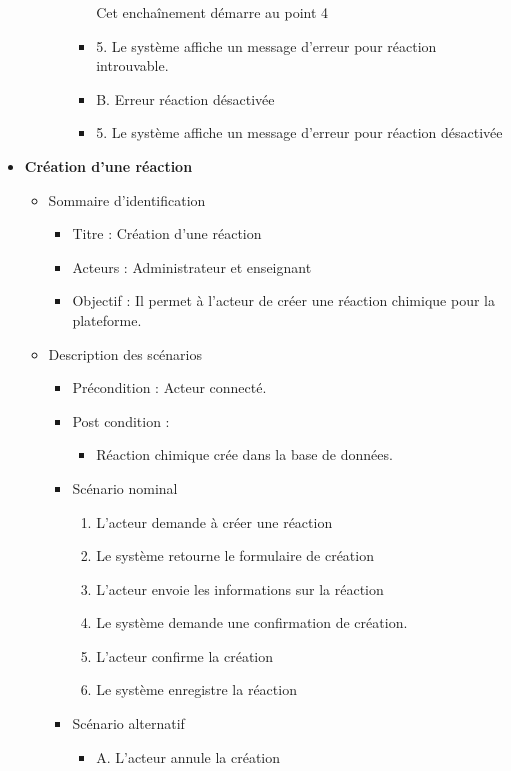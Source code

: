 \begin{itemize}
\begin{itemize}
\begin{itemize}
\begin{itemize}
				                        Cet enchaînement démarre au point 4

				                  \item 5.  Le système affiche un message d’erreur pour réaction introuvable.
				                  \item B. Erreur réaction désactivée
				                  \item 5. Le système affiche un message d’erreur pour réaction désactivée
			                  \end{itemize}
		            \end{itemize}
	      \end{itemize}

	\item \textbf{Création d’une réaction}
	      \begin{itemize}
		      \item Sommaire d’identification
		            \begin{itemize}
			            \item Titre : Création d’une réaction
			            \item Acteurs : Administrateur et enseignant
			            \item Objectif : Il permet à l’acteur de créer une réaction chimique pour la plateforme.
		            \end{itemize}
		      \item Description des scénarios
		            \begin{itemize}
			            \item Précondition : Acteur connecté.
			            \item Post condition :
			                  \begin{itemize}
				                  \item Réaction chimique crée dans la base de données.
			                  \end{itemize}
			            \item Scénario nominal
			                  \begin{enumerate}
				                  \item L’acteur demande à créer une réaction
				                  \item Le système retourne le formulaire de création
				                  \item L’acteur envoie les informations sur la réaction
				                  \item Le système demande une confirmation de création.
				                  \item L’acteur confirme la création
				                  \item Le système enregistre la réaction
			                  \end{enumerate}
			            \item Scénario alternatif
			                  \begin{itemize}
				                  \item A. L’acteur annule la création


\end{itemize}
\end{itemize}
\end{itemize}
\end{itemize}
